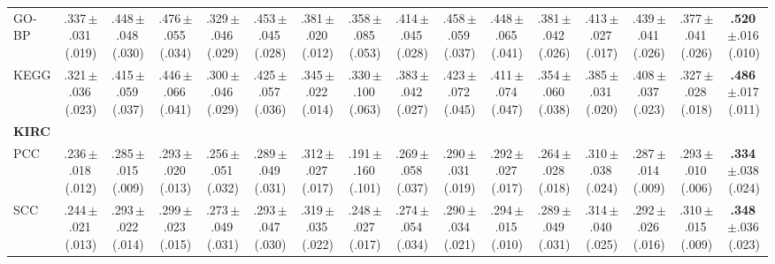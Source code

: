 \begin{table}
\begin{tabular}{lccccccccccccccc}
\quad GO-BP & .337\,{\tiny$\pm$.031}\,{\tiny(.019)} & .448\,{\tiny$\pm$.048}\,{\tiny(.030)} & .476\,{\tiny$\pm$.055}\,{\tiny(.034)} & .329\,{\tiny$\pm$.046}\,{\tiny(.029)} & .453\,{\tiny$\pm$.045}\,{\tiny(.028)} & .381\,{\tiny$\pm$.020}\,{\tiny(.012)} & .358\,{\tiny$\pm$.085}\,{\tiny(.053)} & .414\,{\tiny$\pm$.045}\,{\tiny(.028)} & .458\,{\tiny$\pm$.059}\,{\tiny(.037)} & .448\,{\tiny$\pm$.065}\,{\tiny(.041)} & .381\,{\tiny$\pm$.042}\,{\tiny(.026)} & .413\,{\tiny$\pm$.027}\,{\tiny(.017)} & .439\,{\tiny$\pm$.041}\,{\tiny(.026)} & .377\,{\tiny$\pm$.041}\,{\tiny(.026)} & \textbf{.520}\,{\tiny$\pm$.016}\,{\tiny(.010)}\\
\quad KEGG & .321\,{\tiny$\pm$.036}\,{\tiny(.023)} & .415\,{\tiny$\pm$.059}\,{\tiny(.037)} & .446\,{\tiny$\pm$.066}\,{\tiny(.041)} & .300\,{\tiny$\pm$.046}\,{\tiny(.029)} & .425\,{\tiny$\pm$.057}\,{\tiny(.036)} & .345\,{\tiny$\pm$.022}\,{\tiny(.014)} & .330\,{\tiny$\pm$.100}\,{\tiny(.063)} & .383\,{\tiny$\pm$.042}\,{\tiny(.027)} & .423\,{\tiny$\pm$.072}\,{\tiny(.045)} & .411\,{\tiny$\pm$.074}\,{\tiny(.047)} & .354\,{\tiny$\pm$.060}\,{\tiny(.038)} & .385\,{\tiny$\pm$.031}\,{\tiny(.020)} & .408\,{\tiny$\pm$.037}\,{\tiny(.023)} & .327\,{\tiny$\pm$.028}\,{\tiny(.018)} & \textbf{.486}\,{\tiny$\pm$.017}\,{\tiny(.011)}\\
\midrule
\multicolumn{16}{l}{\textbf{KIRC}}\\
\quad PCC & .236\,{\tiny$\pm$.018}\,{\tiny(.012)} & .285\,{\tiny$\pm$.015}\,{\tiny(.009)} & .293\,{\tiny$\pm$.020}\,{\tiny(.013)} & .256\,{\tiny$\pm$.051}\,{\tiny(.032)} & .289\,{\tiny$\pm$.049}\,{\tiny(.031)} & .312\,{\tiny$\pm$.027}\,{\tiny(.017)} & .191\,{\tiny$\pm$.160}\,{\tiny(.101)} & .269\,{\tiny$\pm$.058}\,{\tiny(.037)} & .290\,{\tiny$\pm$.031}\,{\tiny(.019)} & .292\,{\tiny$\pm$.027}\,{\tiny(.017)} & .264\,{\tiny$\pm$.028}\,{\tiny(.018)} & .310\,{\tiny$\pm$.038}\,{\tiny(.024)} & .287\,{\tiny$\pm$.014}\,{\tiny(.009)} & .293\,{\tiny$\pm$.010}\,{\tiny(.006)} & \textbf{.334}\,{\tiny$\pm$.038}\,{\tiny(.024)}\\
\quad SCC & .244\,{\tiny$\pm$.021}\,{\tiny(.013)} & .293\,{\tiny$\pm$.022}\,{\tiny(.014)} & .299\,{\tiny$\pm$.023}\,{\tiny(.015)} & .273\,{\tiny$\pm$.049}\,{\tiny(.031)} & .293\,{\tiny$\pm$.047}\,{\tiny(.030)} & .319\,{\tiny$\pm$.035}\,{\tiny(.022)} & .248\,{\tiny$\pm$.027}\,{\tiny(.017)} & .274\,{\tiny$\pm$.054}\,{\tiny(.034)} & .290\,{\tiny$\pm$.034}\,{\tiny(.021)} & .294\,{\tiny$\pm$.015}\,{\tiny(.010)} & .289\,{\tiny$\pm$.049}\,{\tiny(.031)} & .314\,{\tiny$\pm$.040}\,{\tiny(.025)} & .292\,{\tiny$\pm$.026}\,{\tiny(.016)} & .310\,{\tiny$\pm$.015}\,{\tiny(.009)} & \textbf{.348}\,{\tiny$\pm$.036}\,{\tiny(.023)}\\

\end{tabular}
\end{table}
